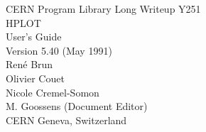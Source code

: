  
\begin{titlepage}
\large
\begin{center}CERN Program Library Long Writeup Y251\\[5cm]
{\Huge HPLOT}\\[1cm]
{\LARGE User's Guide}\\[2cm]
{\LARGE Version 5.40 (May 1991)}\\[5cm]
Ren\'e Brun\\[2mm]
Olivier Couet\\[2mm]
Nicole Cremel-Somon\\[1cm]
M. Goossens (Document Editor)\\[2cm]
CERN Geneva, Switzerland
\end{center}\end{titlepage}
 
